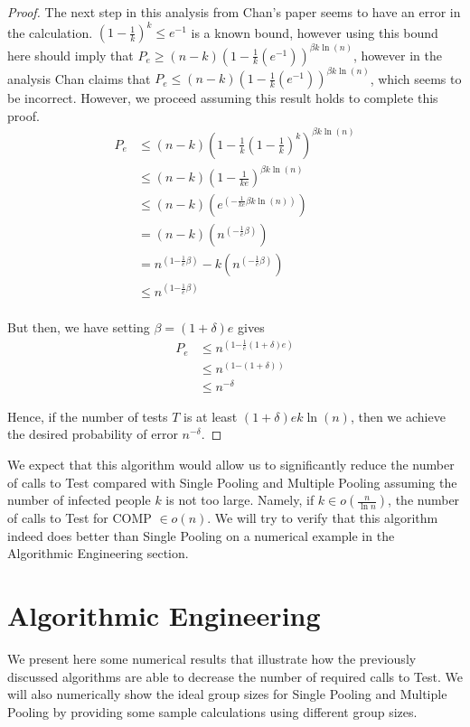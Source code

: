 \documentclass[12pt]{article}
\begin{document}
\begin{proof}
The next step in this analysis from Chan's paper seems to have an error in the calculation. $(1-\frac{1}{k})^k \leq e^{-1}$ is a known bound, however using this bound here should imply that $P_e \geq (n-k)(1-\frac{1}{k}(e^{-1}))^{\beta k \ln (n)} $, however in the analysis Chan claims that $P_e \leq (n-k)(1-\frac{1}{k}(e^{-1}))^{\beta k \ln (n)} $, which seems to be incorrect. However, we proceed assuming this result holds to complete this proof.
\begin{align*}
P_e &\leq (n-k)(1-\frac{1}{k}(1-\frac{1}{k})^k)^{\beta k \ln (n)} \\
    &\leq (n-k)(1-\frac{1}{ke})^{\beta k \ln (n)} \\
    &\leq (n-k)(e^{({-\frac{1}{ke}{\beta k \ln (n)}})}) \\
    &= (n-k)(n^{({-\frac{1}{e}{\beta}})}) \\
    &= n^{(1{-\frac{1}{e}{\beta}})} -k(n^{({-\frac{1}{e}{\beta}})}) \\
    &\leq n^{(1{-\frac{1}{e}{\beta}})} \\
\end{align*}
 
But then, we have setting $\beta = (1+\delta)e$ gives
\begin{align*}
P_e &\leq n^{(1{-\frac{1}{e}{(1+\delta)e}})} \\
    &\leq n^{(1{-{(1+\delta)}})} \\
    &\leq n^{-\delta}
\end{align*}

Hence, if the number of tests $T$ is at least $(1+\delta)e k \ln (n)$, then we achieve the desired probability of error $n^{-\delta}$.
\end{proof}





We expect that this algorithm would allow us to significantly reduce the number of calls to {\sf Test} compared with Single Pooling and Multiple Pooling assuming the number of infected people $k$ is not too large. Namely, if $k \in o(\frac{n}{\ln n})$, the number of calls to  {\sf Test} for COMP $\in o(n)$. We will try to verify that this algorithm indeed does better than Single Pooling on a numerical example in the Algorithmic Engineering section.






\section{Algorithmic Engineering}
We present here some numerical results that illustrate how the previously discussed algorithms are able to decrease the number of required calls to {\sf Test}. We will also numerically show the ideal group sizes for Single Pooling and Multiple Pooling by providing some sample calculations using different group sizes.
\end{document}
